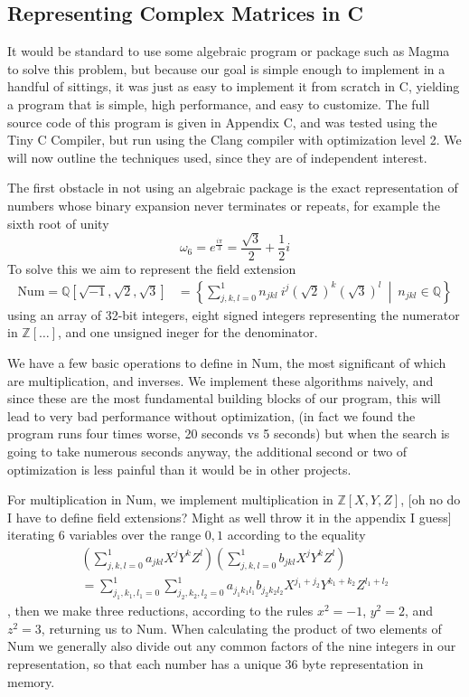 \subsection{Representing Complex Matrices in C}
It would be standard to use some algebraic program or package such as Magma to solve this problem, but because our goal is simple enough to implement in a handful of sittings, it was just as easy to implement it from scratch in C, yielding a program that is simple, high performance, and easy to customize. The full source code of this program is given in Appendix C, and was tested using the Tiny C Compiler, but run using the Clang compiler with optimization level 2. We will now outline the techniques used, since they are of independent interest. 

The first obstacle in not using an algebraic package is the exact representation of numbers whose binary expansion never terminates or repeats, for example the sixth root of unity
\[\omega_6 = e^{\frac{i\pi}{3}} = \frac{\sqrt{3}}{2} + \frac{1}{2}i\]
To solve this we aim to represent the field extension
\begin{align*}
	\text{Num} = \mathbb{Q}[\sqrt{-1}, \sqrt{2}, \sqrt{3}]
	&= \left\{ \sum_{j,k,l = 0}^1 n_{jkl}\ i^j\left(\sqrt{2}\right)^k\left(\sqrt{3}\right)^l
	\ \middle|\ n_{jkl} \in \mathbb{Q}\right\}
\end{align*}
using an array of 32-bit integers, eight signed integers representing the numerator in $\mathbb{Z}[\dots]$, and one unsigned ineger for the denominator.

We have a few basic operations to define in Num, the most significant of which are multiplication, and inverses. We implement these algorithms naively, and since these are the most fundamental building blocks of our program, this will lead to very bad performance without optimization, (in fact we found the program runs four times worse, 20 seconds vs 5 seconds) but when the search is going to take numerous seconds anyway, the additional second or two of optimization is less painful than it would be in other projects.

For multiplication in Num, we implement multiplication in $\mathbb{Z}[X, Y, Z]$, [oh no do I have to define field extensions? Might as well throw it in the appendix I guess] iterating 6 variables over the range ${0, 1}$ according to the equality
\begin{align*}
	\left(\sum_{j,k,l = 0}^1 a_{jkl}X^jY^kZ^l\right)\left(\sum_{j,k,l = 0}^1 b_{jkl}X^jY^kZ^l\right)
	\\= \sum_{j_1,k_1,l_1=0}^1\sum_{j_2,k_2,l_2=0}^1 a_{j_1k_1l_1}b_{j_2k_2l_2}X^{j_1+j_2}Y^{k_1+k_2}Z^{l_1+l_2}
\end{align*}
, then we make three reductions, according to the rules $x^2 = -1$, $y^2 = 2$, and $z^2 = 3$, returning us to Num. When calculating the product of two elements of Num we generally also divide out any common factors of the nine integers in our representation, so that each number has a unique 36 byte representation in memory.

